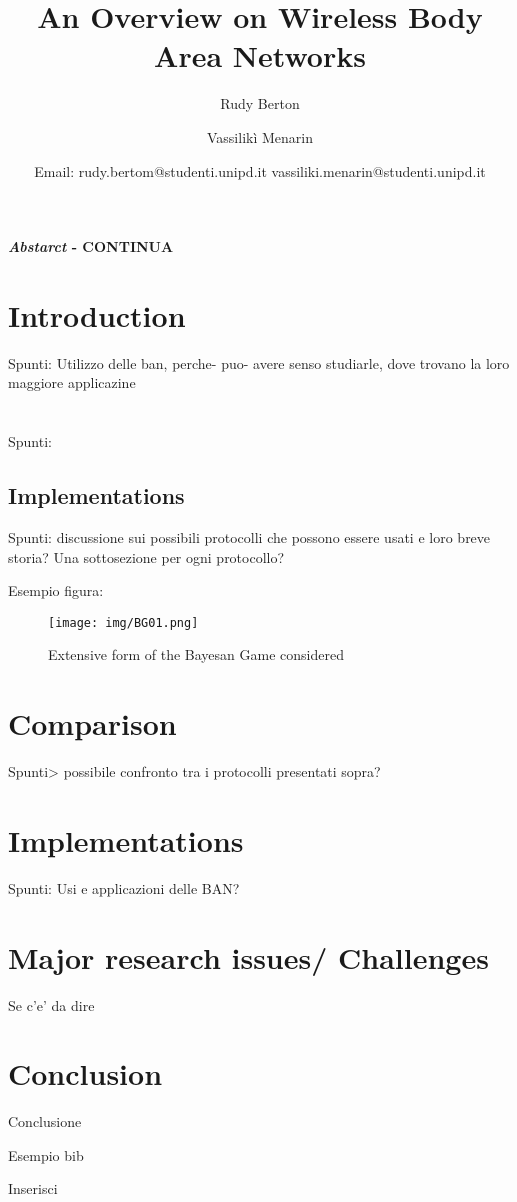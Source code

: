 \documentclass[twocolumn,10pt]{article}
\title{\LARGE \textbf{An Overview on Wireless Body Area Networks}}
\author{Rudy Berton \and Vassilikì Menarin }
\date{\small {Email: rudy.bertom@studenti.unipd.it vassiliki.menarin@studenti.unipd.it }}
\begin{document}
	

	\maketitle
	
	\textbf{\textit{Abstarct} - 
		 CONTINUA}

	
	\section{Introduction}	
	Spunti: Utilizzo delle ban, perche- puo- avere senso studiarle, dove trovano la loro maggiore applicazine
	
	\section{}
	Spunti:
			
	\subsection{Implementations}
	Spunti: discussione sui possibili protocolli che possono essere usati e loro breve storia? Una sottosezione per ogni protocollo?
	
	Esempio figura:		
	\begin{figure}[!h]
		\centering
		\texttt{[image: img/BG01.png]}
		\caption{Extensive form of the Bayesan Game considered}				
		\label{fig:BG01}
	\end{figure}

\section{Comparison}
Spunti> possibile confronto tra i protocolli presentati sopra?

\section{Implementations}
Spunti: Usi e applicazioni delle BAN?

\section{Major research issues/ Challenges}
Se c'e' da dire

\section{Conclusion}
Conclusione

\clearpage

	\begin{thebibliography}{9}	
	Esempio bib
	
	Inserisci
	
	\end{thebibliography}
	
\end{document}
